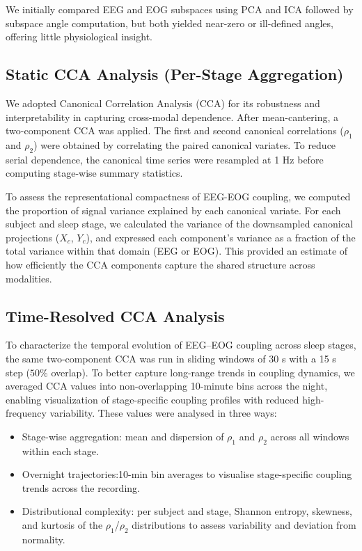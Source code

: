 We initially compared EEG and EOG subspaces using PCA and ICA followed by subspace angle computation, but both yielded near-zero or ill-defined angles, offering little physiological insight. 

\subsection{Static CCA Analysis (Per-Stage Aggregation)}

We adopted Canonical Correlation Analysis (CCA) for its robustness and interpretability in capturing cross-modal dependence. After mean-cantering, a two-component CCA was applied. The first and second canonical correlations ($\rho_1$ and $\rho_2$) were obtained by correlating the paired canonical variates. To reduce serial dependence, the canonical time series were resampled at 1 Hz before computing stage-wise summary statistics.

To assess the representational compactness of EEG-EOG coupling, we computed the proportion of signal variance explained by each canonical variate. For each subject and sleep stage, we calculated the variance of the downsampled canonical projections ($X_c$, $Y_c$), and expressed each component's variance as a fraction of the total variance within that domain (EEG or EOG). This provided an estimate of how efficiently the CCA components capture the shared structure across modalities.


\subsection{Time-Resolved CCA Analysis}

To characterize the temporal evolution of EEG–EOG coupling across sleep stages, the same two-component CCA was run in sliding windows of 30 s with a 15 s step ($50\%$ overlap). To better capture long-range trends in coupling dynamics, we averaged CCA values into non-overlapping 10-minute bins across the night, enabling visualization of stage-specific coupling profiles with reduced high-frequency variability.
These values were analysed in three ways:
\begin{itemize}
    \item Stage-wise aggregation: mean and dispersion of $\rho_1$ and $\rho_2$ across all windows within each stage.
    \item Overnight trajectories:10-min bin averages to visualise stage-specific coupling trends across the recording.
    \item Distributional complexity: per subject and stage, Shannon entropy, skewness, and kurtosis of the $\rho_1$/$\rho_2$ distributions to assess variability and deviation from normality.
\end{itemize}

